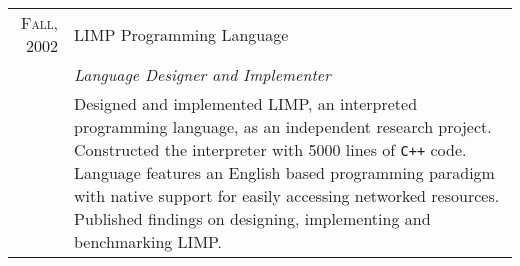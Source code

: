 \documentclass[a4paper,10pt]{article} %
\begin{document}
\begin{tabular}{r|p{11cm}}
\textsc{Fall, 2002} & LIMP Programming Language \\
& \emph{Language Designer and Implementer} \\
& \footnotesize{Designed and implemented LIMP, an interpreted programming language, as an independent research project. Constructed the interpreter with 5000 lines of \texttt{C++} code. Language features an English based programming paradigm with native support for easily accessing networked resources. Published findings on designing, implementing and benchmarking LIMP.} \\

\end{tabular}

\end{document}
